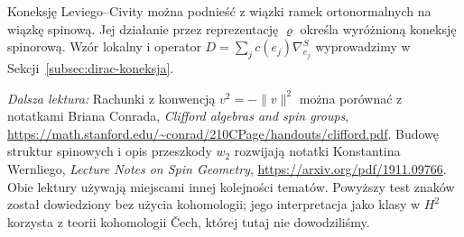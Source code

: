 \begin{uwaga}
Koneksję Leviego--Civity można podnieść z wiązki
ramek ortonormalnych na wiązkę spinową. Jej działanie
przez reprezentację $\varrho$ określa wyróżnioną
koneksję spinorową. Wzór lokalny i operator
$D=\sum_jc(e_j)\nabla^S_{e_j}$ wyprowadzimy
w Sekcji~\ref{subsec:dirac-koneksja}.
\end{uwaga}


\par\smallskip
{\footnotesize\noindent\emph{Dalsza lektura:}
Rachunki z konwencją $v^2=-\|v\|^2$
można porównać z notatkami Briana Conrada,
\emph{Clifford algebras and spin groups},
\url{https://math.stanford.edu/~conrad/210CPage/handouts/clifford.pdf}.
Budowę struktur spinowych i opis przeszkody
$w_2$ rozwijają notatki Konstantina Wernliego,
\emph{Lecture Notes on Spin Geometry},
\url{https://arxiv.org/pdf/1911.09766}.
Obie lektury używają miejscami innej kolejności tematów.
Powyższy test znaków został dowiedziony bez użycia kohomologii;
jego interpretacja jako klasy w $H^2$ korzysta z teorii
kohomologii Čech, której tutaj nie dowodziliśmy.\par}
\clearpage
